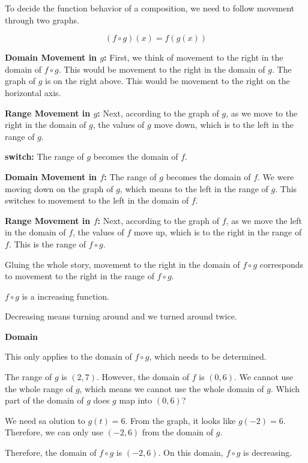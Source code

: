 \documentclass{ximera}
\begin{document}
To decide the function behavior of a composition, we need to follow movement through two graphs. 



\[
(f \circ g)(x) = f(g(x))
\]



\textbf{\textcolor{blue!55!black}{Domain Movement in $g$:}}  First, we think of movement to the right in the domain of $f \circ g$.  This would be movement to the right in the domain of $g$.  The graph of $g$ is on the right above.  This would be movement to the right on the horizontal axis.



\textbf{\textcolor{blue!55!black}{Range Movement in $g$:}}  Next, according to the graph of $g$, as we move to the right in the domain of $g$, the values of $g$ move down, which is to the left in the range of $g$.




\textbf{\textcolor{blue!55!black}{switch:}}   The range of $g$ becomes the domain of $f$.  


\textbf{\textcolor{blue!55!black}{Domain Movement in $f$:}}   The range of $g$ becomes the domain of $f$.  We were moving down on the graph of $g$, which means to the left in the range of $g$.  This switches to movement to the left in the domain of $f$.


\textbf{\textcolor{blue!55!black}{Range Movement in $f$:}}  Next, according to the graph of $f$, as we move the left in the domain of $f$, the values of $f$ move up, which is to the right in the range of $f$.  This is the range of $f \circ g$.




Gluing the whole story, movement to the right in the domain of $f \circ g$ corresponds to movement to the right in the range of $f \circ g$.

$f \circ g$ is a increasing function. 


Decreasing means turning around and we turned around twice. 


\begin{observation} \textbf{\textcolor{-red!75}{Domain}}


This only applies to the domain of $f \circ g$, which needs to be determined. 



The range of $g$ is $(2, 7)$.  However, the domain of $f$ is $(0, 6)$.   We cannot use the whole range of $g$, which means we cannot use the whole domain of $g$.  Which part of the domain of $g$ does $g$ map into $(0, 6)$? 


We need sa olution to $g(t) = 6$.  From the graph, it looks like $g(-2) = 6$.  Therefore, we can only use $(-2, 6)$ from the domain of $g$.


Therefore, the domain of $f \circ g$ is $(-2, 6)$.  On this domain, $f \circ g$ is decreasing.



\end{observation}
\end{document}
